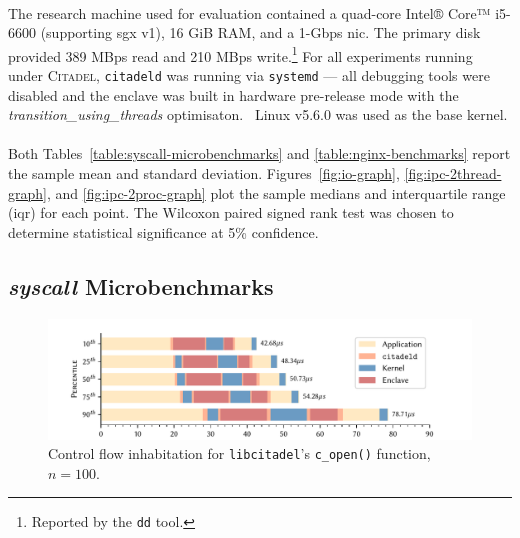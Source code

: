 \paragraph{} The research machine used for evaluation contained a quad-core Intel® Core™ i5-6600 (supporting \acrshort{sgx} v1), 16 GiB RAM, and a 1-Gbps \acrshort{nic}. The primary disk provided 389 MBps read and 210 MBps write.\footnote{Reported by the \texttt{dd} tool.} For all experiments running under \textsc{Citadel}, \texttt{citadeld} was running via \texttt{systemd} --- all debugging tools were disabled and the enclave was built in hardware pre-release mode with the \textit{transition\_using\_threads} optimisaton.~\cite{sgx-switchless} Linux v5.6.0 was used as the base kernel.

\paragraph{} Both Tables~\ref{table:syscall-microbenchmarks} and \ref{table:nginx-benchmarks} report the sample mean and standard deviation. Figures~\ref{fig:io-graph}, \ref{fig:ipc-2thread-graph}, and \ref{fig:ipc-2proc-graph} plot the sample medians and interquartile range (\acrshort{iqr}) for each point. The Wilcoxon paired signed rank test was chosen to determine statistical significance at 5\% confidence.~\cite{10.2307/3001968}

\subsection{\textit{syscall} Microbenchmarks}
\label{sec:syscall-microbenchmarks}

\begin{figure}[]
    \centering
    \includegraphics[width=\linewidth]{figures/graphs/open-anatomy.pdf}
    \vspace{-5mm}
    \caption{Control flow inhabitation for \texttt{libcitadel}'s \texttt{c\_open()} function, $n=100$.}
    \label{fig:open-anatomy}
\end{figure}



